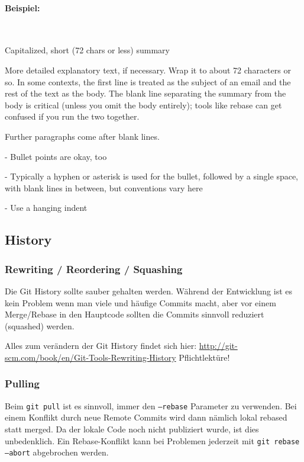 \paragraph{Beispiel:} ~\\

\begin{textcode}
Capitalized, short (72 chars or less) summary

More detailed explanatory text, if necessary.  Wrap it to about 72
characters or so.  In some contexts, the first line is treated as the
subject of an email and the rest of the text as the body. The blank
line separating the summary from the body is critical (unless you omit
the body entirely); tools like rebase can get confused if you run the
two together.

Further paragraphs come after blank lines.

- Bullet points are okay, too

- Typically a hyphen or asterisk is used for the bullet, followed by a
  single space, with blank lines in between, but conventions vary here

- Use a hanging indent
\end{textcode}

\subsection{History}

\subsubsection{Rewriting / Reordering / Squashing}

Die Git History sollte sauber gehalten werden. Während der Entwicklung ist es
kein Problem wenn man viele und häufige Commits macht, aber vor einem
Merge/Rebase in den Hauptcode sollten die Commits sinnvoll reduziert (squashed)
werden. 

Alles zum verändern der Git History findet sich hier:
\url{http://git-scm.com/book/en/Git-Tools-Rewriting-History} Pflichtlektüre!

\subsubsection{Pulling}

Beim \texttt{git pull} ist es sinnvoll, immer den \texttt{--rebase} Parameter zu
verwenden. Bei einem Konflikt durch neue Remote Commits wird dann nämlich lokal
rebased statt merged. Da der lokale Code noch nicht publiziert wurde, ist dies
unbedenklich. Ein Rebase-Konflikt kann bei Problemen jederzeit mit \texttt{git
rebase --abort} abgebrochen werden.


